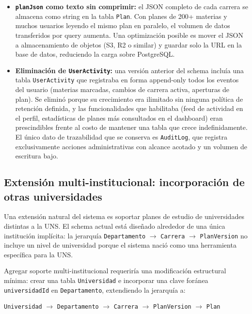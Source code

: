 \documentclass[12pt, a4paper]{report}
\begin{document}
\begin{itemize}
  \item \textbf{\texttt{planJson} como texto sin comprimir:} el JSON completo de cada
        carrera se almacena como string en la tabla \texttt{Plan}. Con planes de 200+
        materias y muchos usuarios leyendo el mismo plan en paralelo, el volumen de
        datos transferidos por query aumenta. Una optimización posible es mover el JSON
        a almacenamiento de objetos (S3, R2 o similar) y guardar solo la URL en la base
        de datos, reduciendo la carga sobre PostgreSQL.
  \item \textbf{Eliminación de \texttt{UserActivity}:} una versión anterior del schema
        incluía una tabla \texttt{UserActivity} que registraba en forma append-only todos
        los eventos del usuario (materias marcadas, cambios de carrera activa, aperturas
        de plan). Se eliminó porque su crecimiento era ilimitado sin ninguna política de
        retención definida, y las funcionalidades que habilitaba (feed de actividad en el
        perfil, estadísticas de planes más consultados en el dashboard) eran prescindibles
        frente al costo de mantener una tabla que crece indefinidamente. El único dato de
        trazabilidad que se conserva es \texttt{AuditLog}, que registra exclusivamente
        acciones administrativas con alcance acotado y un volumen de escritura bajo.
\end{itemize}

\subsection{Extensión multi-institucional: incorporación de otras universidades}

Una extensión natural del sistema es soportar planes de estudio de universidades distintas
a la UNS. El schema actual está diseñado alrededor de una única institución implícita: la
jerarquía \texttt{Departamento} $\rightarrow$ \texttt{Carrera} $\rightarrow$
\texttt{PlanVersion} no incluye un nivel de universidad porque el sistema nació como
una herramienta específica para la UNS.

Agregar soporte multi-institucional requeriría una modificación estructural mínima: crear
una tabla \texttt{Universidad} e incorporar una clave foránea \texttt{universidadId} en
\texttt{Departamento}, extendiendo la jerarquía a:

\begin{center}
\texttt{Universidad} $\longrightarrow$ \texttt{Departamento} $\longrightarrow$
\texttt{Carrera} $\longrightarrow$ \texttt{PlanVersion} $\longrightarrow$ \texttt{Plan}
\end{center}
\end{document}
